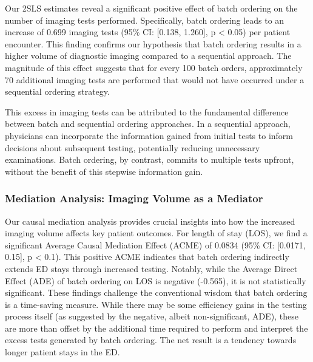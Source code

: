 \documentclass{article}
\begin{document}
Our 2SLS estimates reveal a significant positive effect of batch
ordering on the number of imaging tests performed. Specifically, batch
ordering leads to an increase of 0.699 imaging tests (95\% CI: {[}0.138,
1.260{]}, p \textless{} 0.05) per patient encounter. This finding
confirms our hypothesis that batch ordering results in a higher volume
of diagnostic imaging compared to a sequential approach. The magnitude
of this effect suggests that for every 100 batch orders, approximately
70 additional imaging tests are performed that would not have occurred
under a sequential ordering strategy.

This excess in imaging tests can be attributed to the fundamental
difference between batch and sequential ordering approaches. In a
sequential approach, physicians can incorporate the information gained
from initial tests to inform decisions about subsequent testing,
potentially reducing unnecessary examinations. Batch ordering, by
contrast, commits to multiple tests upfront, without the benefit of this
stepwise information gain.

\hypertarget{mediation-analysis-imaging-volume-as-a-mediator}{%
\subsubsection{Mediation Analysis: Imaging Volume as a
Mediator}\label{mediation-analysis-imaging-volume-as-a-mediator}}

Our causal mediation analysis provides crucial insights into how the
increased imaging volume affects key patient outcomes. For length of
stay (LOS), we find a significant Average Causal Mediation Effect (ACME)
of 0.0834 (95\% CI: {[}0.0171, 0.15{]}, p \textless{} 0.1). This
positive ACME indicates that batch ordering indirectly extends ED stays
through increased testing. Notably, while the Average Direct Effect
(ADE) of batch ordering on LOS is negative (-0.565), it is not
statistically significant. These findings challenge the conventional
wisdom that batch ordering is a time-saving measure. While there may be
some efficiency gains in the testing process itself (as suggested by the
negative, albeit non-significant, ADE), these are more than offset by
the additional time required to perform and interpret the excess tests
generated by batch ordering. The net result is a tendency towards longer
patient stays in the ED.
\end{document}

